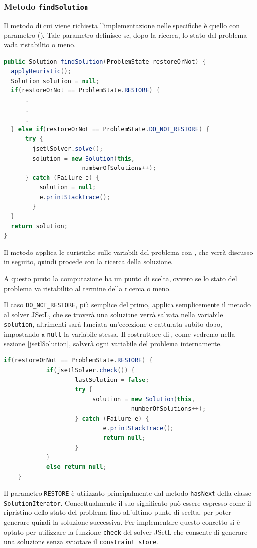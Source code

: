\subsubsection{Metodo \texttt{findSolution}}
Il metodo  di cui viene richiesta l'implementazione nelle
specifiche è quello con parametro (). Tale parametro
definisce se, dopo la ricerca, lo stato del problema vada ristabilito o meno.

\begin{lstlisting}[language = Java,
                   caption = {\files{findSolution}.}]  
public Solution findSolution(ProblemState restoreOrNot) { 
  applyHeuristic();
  Solution solution = null;
  if(restoreOrNot == ProblemState.RESTORE) {
      .
      .
      .
  } else if(restoreOrNot == ProblemState.DO_NOT_RESTORE) { 
      try { 
        jsetlSolver.solve(); 
        solution = new Solution(this,  
                      numberOfSolutions++); 
      } catch (Failure e) {
          solution = null; 
          e.printStackTrace(); 
        } 
  } 
  return solution;  
}
\end{lstlisting}
Il metodo applica le euristiche sulle variabili del problema con
, che verrà discusso in seguito, quindi procede con la
ricerca della soluzione.

A questo punto la computazione ha un punto di scelta, ovvero se lo stato del 
problema va ristabilito al termine della ricerca o meno. 

Il caso \texttt{DO\_NOT\_RESTORE}, più semplice del primo, applica
semplicemente il metodo  al solver JSetL, che se troverà una 
soluzione verrà salvata nella variabile \texttt{solution}, altrimenti 
sarà lanciata un'eccezione e catturata subito dopo, impostando a \texttt{null}
la variabile stessa. Il costruttore di 
, come vedremo nella sezione \ref{jsetlSolution},
salverà ogni variabile del problema internamente.

\begin{lstlisting}[language = Java,
                   caption = {\files{findSolution} il caso \texttt{RESTORE}.}] 
    if(restoreOrNot == ProblemState.RESTORE) {
            if(jsetlSolver.check()) {
                    lastSolution = false;
                    try {
                         solution = new Solution(this, 
                                    numberOfSolutions++);
                    } catch (Failure e) {
                            e.printStackTrace();
                            return null;
                    }
            }
            else return null;
    }
\end{lstlisting}
Il parametro \texttt{RESTORE} è utilizzato principalmente dal metodo
\texttt{hasNext} della classe \texttt{SolutionIterator}. Concettualmente
il suo significato può essere espresso come il ripristino dello stato del 
problema fino all'ultimo punto di scelta, per poter generare quindi la soluzione
successiva. Per implementare questo concetto si è optato per utilizzare la
funzione \texttt{check} del solver JSetL che consente di generare una soluzione
senza svuotare il \texttt{constraint store}.

